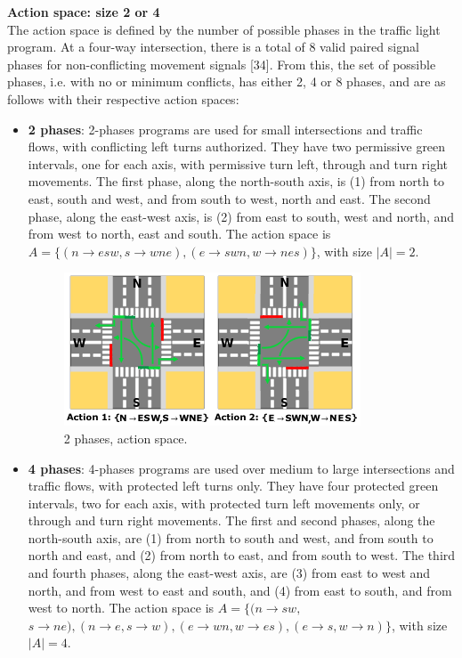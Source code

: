 \textbf{Action space: size 2 or 4} \\ 
The action space is defined by the number of possible phases in the traffic light program. At a four-way intersection, there is a total of 8 valid paired signal phases for non-conflicting movement signals [34]. From this, the set of possible phases, i.e. with no or minimum conflicts, has either 2, 4 or 8 phases, and are as follows with their respective action spaces:
\begin{itemize}
\setlength\itemsep{-0.5em}
  \item \textbf{2 phases}: 2-phases programs are used for small intersections and traffic flows, with conflicting left turns authorized. They have two permissive green intervals, one for each axis, with permissive turn left, through and turn right movements. The first phase, along the north-south axis, is (1) from north to east, south and west, and from south to west, north and east. The second phase, along the east-west axis, is (2) from east to south, west and north, and from west to north, east and south. The action space is $A=\{(n\rightarrow esw,s\rightarrow wne),(e\rightarrow swn,w\rightarrow nes)\}$, with size $|A|=2$.
  \begin{figure}[h]
    \includegraphics[scale=0.8]{img/II/2phases.png}
    \centering
    \captionsetup{justification=centering}
    \caption{2 phases, action space.}
  \end{figure}
  \item \textbf{4 phases}: 4-phases programs are used over medium to large intersections and traffic flows, with protected left turns only. They have four protected green intervals, two for each axis, with protected turn left movements only, or through and turn right movements. The first and second phases, along the north-south axis, are (1) from north to south and west, and from south to north and east, and (2) from north to east, and from south to west. The third and fourth phases, along the east-west axis, are (3) from east to west and north, and from west to east and south, and (4) from east to south, and from west to north. The action space is $A=\{(n\rightarrow sw,$ $s\rightarrow ne),(n\rightarrow e,s\rightarrow w),(e\rightarrow wn,w\rightarrow es),(e\rightarrow s,w\rightarrow n)\}$, with size $|A|=4$.

\end{itemize}
